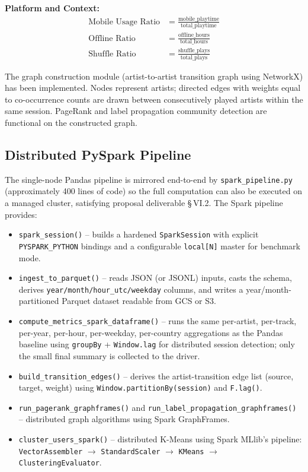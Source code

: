 \documentclass[conference]{IEEEtran}
\begin{document}
\textbf{Platform and Context:}
\begin{align}
\text{Mobile Usage Ratio} &= \frac{\text{mobile\_playtime}}{\text{total\_playtime}} \\
\text{Offline Ratio} &= \frac{\text{offline\_hours}}{\text{total\_hours}} \\
\text{Shuffle Ratio} &= \frac{\text{shuffle\_plays}}{\text{total\_plays}}
\end{align}

The graph construction module (artist-to-artist transition graph using NetworkX) has been implemented. Nodes represent artists; directed edges with weights equal to co-occurrence counts are drawn between consecutively played artists within the same session. PageRank and label propagation community detection are functional on the constructed graph.

\subsection{Distributed PySpark Pipeline}

The single-node Pandas pipeline is mirrored end-to-end by \texttt{spark\_pipeline.py} (approximately 400 lines of code) so the full computation can also be executed on a managed cluster, satisfying proposal deliverable \S\,VI.2. The Spark pipeline provides:

\begin{itemize}
    \item \texttt{spark\_session()} -- builds a hardened \texttt{SparkSession} with explicit \texttt{PYSPARK\_PYTHON} bindings and a configurable \texttt{local[N]} master for benchmark mode.
    \item \texttt{ingest\_to\_parquet()} -- reads JSON (or JSONL) inputs, casts the schema, derives \texttt{year/month/hour\_utc/weekday} columns, and writes a year/month-partitioned Parquet dataset readable from GCS or S3.
    \item \texttt{compute\_metrics\_spark\_dataframe()} -- runs the same per-artist, per-track, per-year, per-hour, per-weekday, per-country aggregations as the Pandas baseline using \texttt{groupBy} + \texttt{Window.lag} for distributed session detection; only the small final summary is collected to the driver.
    \item \texttt{build\_transition\_edges()} -- derives the artist-transition edge list (source, target, weight) using \texttt{Window.partitionBy(session)} and \texttt{F.lag()}.
    \item \texttt{run\_pagerank\_graphframes()} and \texttt{run\_label\_propagation\_graphframes()} -- distributed graph algorithms using Spark GraphFrames.
    \item \texttt{cluster\_users\_spark()} -- distributed K-Means using Spark MLlib's pipeline: \texttt{VectorAssembler} $\rightarrow$ \texttt{StandardScaler} $\rightarrow$ \texttt{KMeans} $\rightarrow$ \texttt{ClusteringEvaluator}.
\end{itemize}
\end{document}
